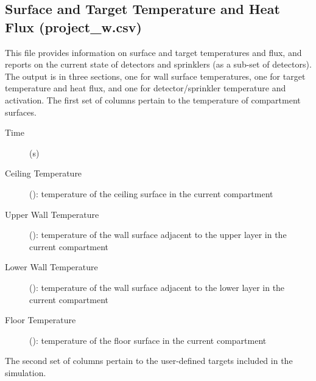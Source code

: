 \subsection{Surface and Target Temperature and Heat Flux (project\_w.csv)}

This file provides information on surface and target temperatures and flux, and reports on the current state of detectors and sprinklers (as a sub-set of detectors). The output is in three sections, one for wall surface temperatures, one for target temperature and heat flux, and one for detector/sprinkler temperature and activation. The first set of columns pertain to the temperature of compartment surfaces.
\begin{description}
\item[Time] (s)
\item[Ceiling Temperature] (\degc): temperature of the ceiling surface in the current compartment
\item[Upper Wall Temperature] (\degc): temperature of the wall surface adjacent to the upper layer in the current compartment
\item[Lower Wall Temperature] (\degc): temperature of the  wall surface adjacent to the lower layer in the current compartment
\item[Floor Temperature] (\degc): temperature of the floor surface in the current compartment
\end{description}
The second set of columns pertain to the user-defined targets included in the simulation. 
